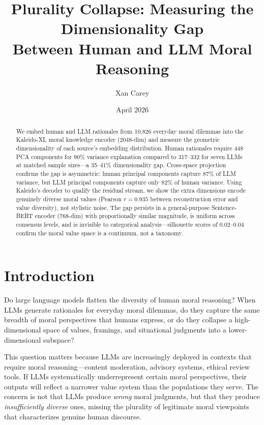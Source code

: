 \documentclass[11pt,a4paper]{article}
\title{\textbf{Plurality Collapse: Measuring the Dimensionality Gap\\Between Human and LLM Moral Reasoning}}
\author{Xan Carey}
\date{April 2026}
\begin{document}
\maketitle

\begin{abstract}
We embed human and LLM rationales from 10,826 everyday moral dilemmas into the Kaleido-XL moral knowledge encoder (2048-dim) and measure the geometric dimensionality of each source's embedding distribution. Human rationales require 448 PCA components for 90\% variance explanation compared to 317--332 for seven LLMs at matched sample sizes---a 35--41\% dimensionality gap. Cross-space projection confirms the gap is asymmetric: human principal components capture 87\% of LLM variance, but LLM principal components capture only 82\% of human variance. Using Kaleido's decoder to qualify the residual stream, we show the extra dimensions encode genuinely diverse moral values (Pearson $r = 0.935$ between reconstruction error and value diversity), not stylistic noise. The gap persists in a general-purpose Sentence-BERT encoder (768-dim) with proportionally similar magnitude, is uniform across consensus levels, and is invisible to categorical analysis---silhouette scores of 0.02--0.04 confirm the moral value space is a continuum, not a taxonomy.
\end{abstract}

\section{Introduction}

Do large language models flatten the diversity of human moral reasoning? When LLMs generate rationales for everyday moral dilemmas, do they capture the same breadth of moral perspectives that humans express, or do they collapse a high-dimensional space of values, framings, and situational judgments into a lower-dimensional subspace?

This question matters because LLMs are increasingly deployed in contexts that require moral reasoning---content moderation, advisory systems, ethical review tools. If LLMs systematically underrepresent certain moral perspectives, their outputs will reflect a narrower value system than the populations they serve. The concern is not that LLMs produce \emph{wrong} moral judgments, but that they produce \emph{insufficiently diverse} ones, missing the plurality of legitimate moral viewpoints that characterizes genuine human discourse.
\end{document}
